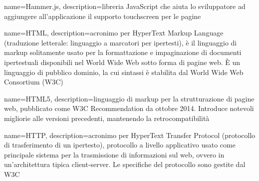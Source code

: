 {
	name=Hammer.js,
	description={libreria JavaScript che aiuta lo sviluppatore ad aggiungere all'applicazione il supporto touchscreen per le pagine}
}

{
	name=HTML,
	description={acronimo per HyperText Markup Language (traduzione letterale: linguaggio a marcatori per ipertesti), è il linguaggio di markup solitamente usato per la formattazione e impaginazione di documenti ipertestuali disponibili nel World Wide Web sotto forma di pagine web. È un linguaggio di pubblico dominio, la cui sintassi è stabilita dal World Wide Web Consortium (W3C)}
}

{
	name=HTML5,
	description={linguaggio di markup per la strutturazione di pagine web, pubblicato come W3C Recommendation da ottobre 2014. Introduce notevoli migliorie alle versioni precedenti, mantenendo la retrocompatibilità}
}

{
	name=HTTP,
	description={acronimo per HyperText Transfer Protocol (protocollo di trasferimento di un ipertesto), protocollo a livello applicativo usato come principale sistema per la trasmissione di informazioni sul web, ovvero in un'architettura tipica client-server. Le specifiche del protocollo sono gestite dal W3C}
}


